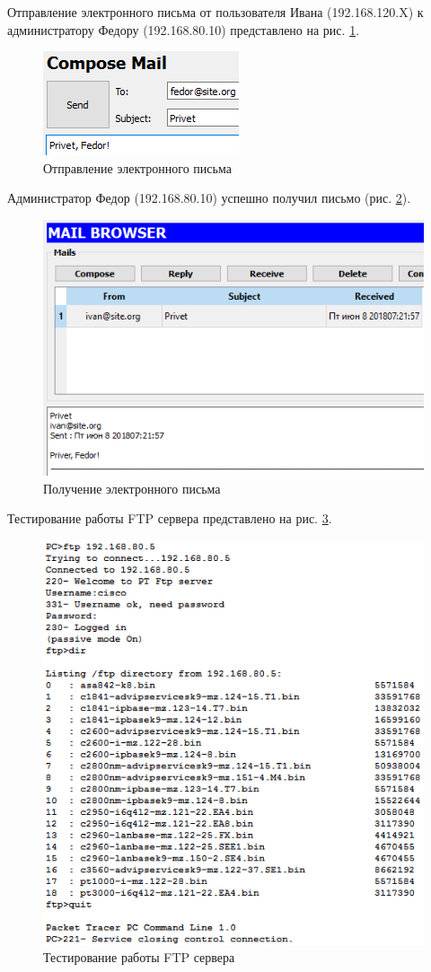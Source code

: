 Отправление электронного письма от пользователя Ивана (192.168.120.X) к администратору Федору (192.168.80.10) представлено на рис. \ref{image:6_3_1}.

\begin{figure}[h!]
	\centering
	\includegraphics[scale = 0.95]{images/6_3_1.png}
	\caption{Отправление электронного письма}
	\label{image:6_3_1}
\end{figure}

Администратор Федор (192.168.80.10) успешно получил письмо (рис. \ref{image:6_3_2}).

\begin{figure}[h!]
	\centering
	\includegraphics[scale = 0.95]{images/6_3_2.png}
	\caption{Получение электронного письма}
	\label{image:6_3_2}
\end{figure}

\clearpage

Тестирование работы FTP сервера представлено на рис. \ref{image:6_4}.

\begin{figure}[h!]
	\centering
	\includegraphics[scale = 0.85]{images/6_4.png}
	\caption{Тестирование работы FTP сервера}
	\label{image:6_4}
\end{figure}
